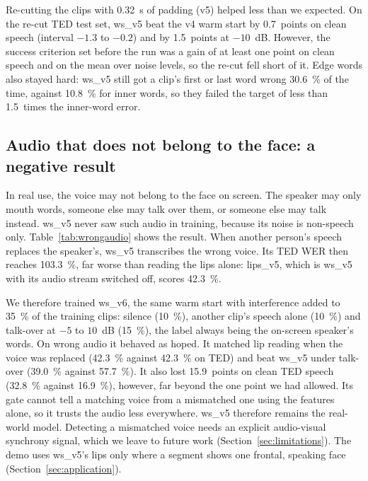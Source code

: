 Re-cutting the clips with 0.32~s of padding (v5) helped less than we expected. On the re-cut TED
test set, ws\_v5 beat the v4 warm start by 0.7~points on clean speech (interval $-1.3$ to
$-0.2$) and by 1.5~points at $-10$~dB. However, the success criterion set before the run was a
gain of at least one point on clean speech and on the mean over noise levels, so the re-cut fell
short of it. Edge words also stayed hard: ws\_v5 still got a clip's first or last word wrong
30.6~\% of the time, against 10.8~\% for inner words, so they failed the target of less than
1.5~times the inner-word error.

\subsection{Audio that does not belong to the face: a negative result}
In real use, the voice may not belong to the face on screen. The speaker may only mouth words,
someone else may talk over them, or someone else may talk instead. ws\_v5 never saw such audio
in training, because its noise is non-speech only. Table~\ref{tab:wrongaudio} shows the result.
When another person's speech replaces the speaker's, ws\_v5 transcribes the wrong voice. Its TED
WER then reaches 103.3~\%, far worse than reading the lips alone: lips\_v5, which is ws\_v5 with
its audio stream switched off, scores 42.3~\%.

We therefore trained ws\_v6, the same warm start with interference added to 35~\% of the
training clips: silence (10~\%), another clip's speech alone (10~\%) and talk-over at
$-5$ to $10$~dB (15~\%), the label always being the on-screen speaker's words. On wrong audio it
behaved as hoped. It matched lip reading when the voice was replaced (42.3~\% against 42.3~\% on
TED) and beat ws\_v5 under talk-over (39.0~\% against 57.7~\%). It also lost 15.9~points on
clean TED speech (32.8~\% against 16.9~\%), however, far beyond the one point we had allowed. Its
gate cannot tell a matching voice from a mismatched one using the features alone, so it trusts
the audio less everywhere. ws\_v5 therefore remains the real-world model. Detecting a mismatched
voice needs an explicit audio-visual synchrony signal, which we leave to future work
(Section~\ref{sec:limitations}). The demo uses ws\_v5's lips only where a segment shows one
frontal, speaking face (Section~\ref{sec:application}).

